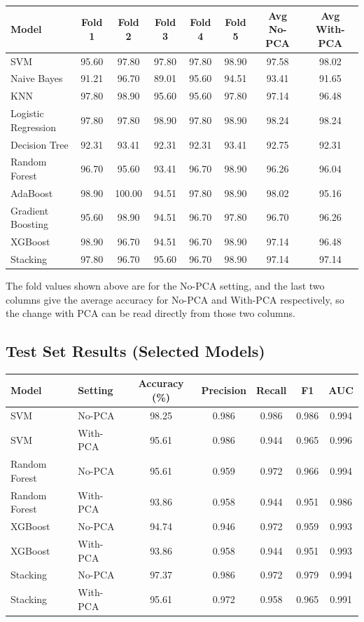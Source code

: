 \documentclass[12pt,a4paper]{article}
\begin{document}
\begin{longtable}{lccccccc}
\toprule
Model & Fold 1 & Fold 2 & Fold 3 & Fold 4 & Fold 5 & Avg No-PCA & Avg With-PCA \\
\midrule
\endhead
SVM & 95.60 & 97.80 & 97.80 & 97.80 & 98.90 & 97.58 & 98.02 \\
Naive Bayes & 91.21 & 96.70 & 89.01 & 95.60 & 94.51 & 93.41 & 91.65 \\
KNN & 97.80 & 98.90 & 95.60 & 95.60 & 97.80 & 97.14 & 96.48 \\
Logistic Regression & 97.80 & 97.80 & 98.90 & 97.80 & 98.90 & 98.24 & 98.24 \\
Decision Tree & 92.31 & 93.41 & 92.31 & 92.31 & 93.41 & 92.75 & 92.31 \\
Random Forest & 96.70 & 95.60 & 93.41 & 96.70 & 98.90 & 96.26 & 96.04 \\
AdaBoost & 98.90 & 100.00 & 94.51 & 97.80 & 98.90 & 98.02 & 95.16 \\
Gradient Boosting & 95.60 & 98.90 & 94.51 & 96.70 & 97.80 & 96.70 & 96.26 \\
XGBoost & 98.90 & 96.70 & 94.51 & 96.70 & 98.90 & 97.14 & 96.48 \\
Stacking & 97.80 & 96.70 & 95.60 & 96.70 & 98.90 & 97.14 & 97.14 \\
\bottomrule
\end{longtable}

The fold values shown above are for the No-PCA setting, and the last two columns give the average accuracy for No-PCA and With-PCA respectively, so the change with PCA can be read directly from those two columns.

\subsection*{Test Set Results (Selected Models)}

\begin{tabular}{llccccc}
\toprule
Model & Setting & Accuracy (\%) & Precision & Recall & F1 & AUC \\
\midrule
SVM & No-PCA & 98.25 & 0.986 & 0.986 & 0.986 & 0.994 \\
SVM & With-PCA & 95.61 & 0.986 & 0.944 & 0.965 & 0.996 \\
Random Forest & No-PCA & 95.61 & 0.959 & 0.972 & 0.966 & 0.994 \\
Random Forest & With-PCA & 93.86 & 0.958 & 0.944 & 0.951 & 0.986 \\
XGBoost & No-PCA & 94.74 & 0.946 & 0.972 & 0.959 & 0.993 \\
XGBoost & With-PCA & 93.86 & 0.958 & 0.944 & 0.951 & 0.993 \\
Stacking & No-PCA & 97.37 & 0.986 & 0.972 & 0.979 & 0.994 \\
Stacking & With-PCA & 95.61 & 0.972 & 0.958 & 0.965 & 0.991 \\
\bottomrule
\end{tabular}
\end{document}

